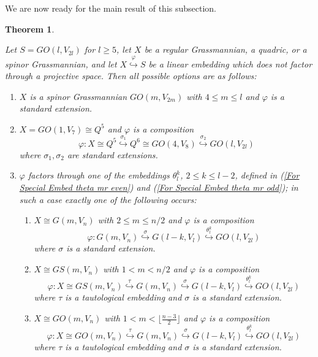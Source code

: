 \documentclass[12pt]{amsart}
\def\hw  {\hookrightarrow}
\newtheorem{theorem}{Theorem}[section]
\begin{document}
We are now ready for the main result of this subsection.

\begin{theorem}\label{Theo Embed in Spinor}

Let $S=GO(l,V_{2l})$ for $l\geq 5$, let $X$ be a regular Grassmannian, a quadric, or a spinor Grassmannian, and let $X\stackrel{\varphi}{\hw} S$ be a linear embedding which does not factor through a projective space. Then all possible options are as follows:

\begin{enumerate}
\item[{\rm (i)}] $X$ is a spinor Grassmannian $GO(m,V_{2m})$ with $4\leq m\leq l$ and $\varphi$ is a standard extension.

\item[{\rm (ii)}] $X= GO(1,V_7)\cong Q^5$ and $\varphi$ is a composition
$$
\varphi: X\cong Q^5 \stackrel{\sigma_1}{\hw} Q^6 \cong GO(4,V_8) \stackrel{\sigma_2}{\hw} GO(l,V_{2l})
$$
where $\sigma_1,\sigma_2$ are standard extensions.

\item[{\rm (iii)}] $\varphi$ factors through one of the embeddings $\theta_l^k$, $2\leq k\leq l-2$, defined in (\ref{For Special Embed theta mr even}) and (\ref{For Special Embed theta mr odd}); in such a case exactly one of the following occurs:
\begin{enumerate}
\item[{\rm (iii.1)}] $X\cong G(m,V_n)$ with $2\leq m\leq n/2$ and $\varphi$ is a composition
$$
\varphi: G(m,V_n) \stackrel{\sigma}{\hw} G(l-k,V_l) \stackrel{\theta_l^k}{\hw} GO(l,V_{2l}) 
$$
where $\sigma$ is a standard extension.

\item[{\rm (iii.2)}] $X\cong GS(m,V_{n})$ with $1< m< n/2$ and $\varphi$ is a composition
$$
\varphi: X\cong GS(m,V_n) \stackrel{\tau}{\hw} G(m,V_n) \stackrel{\sigma}{\hw} G(l-k,V_l) \stackrel{\theta_l^k}{\hw} GO(l,V_{2l})
$$
where $\tau$ is a tautological embedding and $\sigma$ is a standard extension.

\item[{\rm (iii.3)}] $X\cong GO(m,V_{n})$ with $1< m<\lfloor\frac{n-3}{2}\rfloor$ and $\varphi$ is a composition
$$
\varphi: X\cong GO(m,V_n) \stackrel{\tau}{\hw} G(m,V_n) \stackrel{\sigma}{\hw} G(l-k,V_l) \stackrel{\theta_l^k}{\hw} GO(l,V_{2l})
$$
where $\tau$ is a tautological embedding and $\sigma$ is a standard extension.
\end{enumerate}
\end{enumerate}
\end{theorem}
\end{document}
